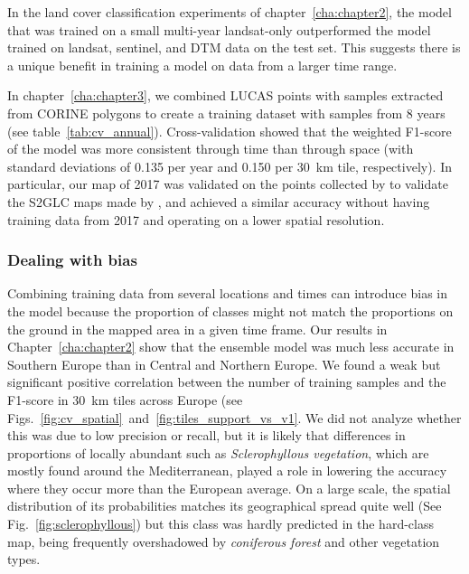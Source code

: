         In the land cover classification experiments of chapter~\ref{cha:chapter2}, the model that was trained on a small multi-year landsat-only outperformed the model trained on landsat, sentinel, and DTM data on the test set. This suggests there is a unique benefit in training a model on data from a larger time range.
        
        In chapter~\ref{cha:chapter3}, we combined LUCAS points with samples extracted from CORINE polygons to create a training dataset with samples from 8 years (see table~\ref{tab:cv_annual}). Cross-validation showed that the weighted F1-score of the model was more consistent through time than through space (with standard deviations of 0.135 per year and 0.150 per 30~km tile, respectively). 
        In particular, our map of 2017 was validated on the points collected by \citep{jenerowicz2021validation} to validate the S2GLC maps made by \citet{malinowski2020automated}, and achieved a similar accuracy without having training data from 2017 and operating on a lower spatial resolution.

        \subsubsection{Dealing with bias}
        Combining training data from several locations and times can introduce bias in the model because the proportion of classes might not match the proportions on the ground in the mapped area in a given time frame. Our results in Chapter\@~\ref{cha:chapter2} show that the ensemble model was much less accurate in Southern Europe than in Central and Northern Europe. We found a weak but significant positive correlation between the number of training samples and the F1-score in 30~km tiles across Europe (see Figs.\@~\ref{fig:cv_spatial}\@~and\@~\ref{fig:tiles_support_vs_v1}. We did not analyze whether this was due to low precision or recall, but it is likely that differences in proportions of locally abundant such as \textit{Sclerophyllous vegetation}, which are mostly found around the Mediterranean, played a role in lowering the accuracy where they occur more than the European average. On a large scale, the spatial distribution of its probabilities matches its geographical spread quite well (See Fig.\@~\ref{fig:sclerophyllous}) but this class was hardly predicted in the hard-class map, being frequently overshadowed by \textit{coniferous forest} and other vegetation types.  

